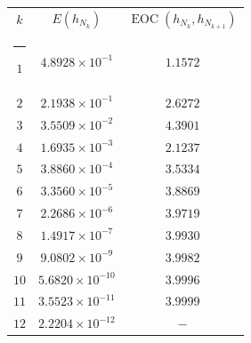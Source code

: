 \documentclass[]{scrartcl}
\makeatletter
\newcommand{\thickhline}{%
    \noalign {\ifnum 0=`}\fi \hrule height 1pt
    \futurelet \reserved@a \@xhline
}
\makeatother
\begin{document}
 	\renewcommand{\arraystretch}{1.2}
 	\begin{tabular}{|c|c|c|}\hline
 	$k$  & $E(h_{N_k})$ & $\operatorname{EOC}(h_{N_k},h_{N_{k+1}})$\\\thickhline
 	$1$  & $4.8928\times10^{-1}$ & $1.1572$\\\hline
 	$2$  & $2.1938\times10^{-1}$ & $2.6272$\\\hline
 	$3$  & $3.5509\times10^{-2}$ & $4.3901$\\\hline
 	$4$  & $1.6935\times10^{-3}$ & $2.1237$\\\hline
 	$5$  & $3.8860\times10^{-4}$ & $3.5334$\\\hline
 	$6$  & $3.3560\times10^{-5}$ & $3.8869$\\\hline
 	$7$  & $2.2686\times10^{-6}$ & $3.9719$\\\hline
 	$8$  & $1.4917\times10^{-7}$ & $3.9930$\\\hline
 	$9$  & $9.0802\times10^{-9}$ & $3.9982$\\\hline
 	$10$ & $5.6820\times10^{-10}$ & $3.9996$\\\hline
 	$11$ & $3.5523\times10^{-11}$ & $3.9999$\\\hline
 	$12$ & $2.2204\times10^{-12}$ & $-$\\\hline
 	\end{tabular} 
\end{document}
